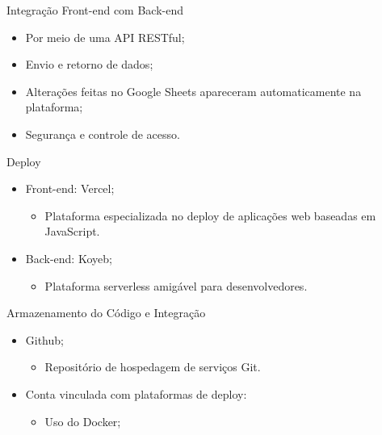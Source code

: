\begin{frame}{Integração Front-end com Back-end}
    \begin{itemize}
        \item Por meio de uma API RESTful; \vspace{0.5cm}
        \item Envio e retorno de dados; \vspace{0.5cm}
        \item Alterações feitas no Google Sheets apareceram automaticamente na plataforma; \vspace{0.5cm}
        \item Segurança e controle de acesso. \vspace{0.5cm}
    \end{itemize}
\end{frame}

\begin{frame}{Deploy}
    \begin{itemize}
        \item Front-end: Vercel; \vspace{0.5cm}
              \begin{itemize}
                  \item Plataforma especializada no deploy de aplicações web baseadas em JavaScript. \vspace{0.5cm}
              \end{itemize}
        \item Back-end: Koyeb; \vspace{0.5cm}
              \begin{itemize}
                  \item Plataforma serverless amigável para desenvolvedores. \vspace{0.5cm}
              \end{itemize}
    \end{itemize}
\end{frame}

\begin{frame}{Armazenamento do Código e Integração}
    \begin{itemize}
        \item Github; \vspace{0.5cm}
              \begin{itemize}
                  \item Repositório de hospedagem de serviços Git. \vspace{0.5cm}
              \end{itemize}
        \item Conta vinculada com plataformas de deploy: \vspace{0.5cm}
              \begin{itemize}
                  \item Uso do Docker; \vspace{0.5cm}
              \end{itemize}
    \end{itemize}
\end{frame}

